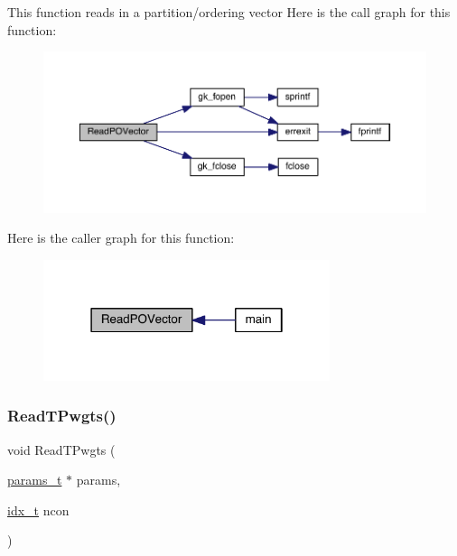 This function reads in a partition/ordering vector Here is the call graph for this function\+:\nopagebreak
\begin{figure}[H]
\begin{center}
\leavevmode
\includegraphics[width=350pt]{a00948_a65a7c382444e5132dafddb75b6117754_cgraph}
\end{center}
\end{figure}
Here is the caller graph for this function\+:\nopagebreak
\begin{figure}[H]
\begin{center}
\leavevmode
\includegraphics[width=238pt]{a00948_a65a7c382444e5132dafddb75b6117754_icgraph}
\end{center}
\end{figure}
\mbox{\label{a00948_a12b940ccee061b8787088fbe16245f46}} 
\subsubsection{\texorpdfstring{Read\+T\+Pwgts()}{ReadTPwgts()}}
{\footnotesize\ttfamily void Read\+T\+Pwgts (\begin{DoxyParamCaption}\item[{\hyperlink{a00706}{params\+\_\+t} $\ast$}]{params,  }\item[{\hyperlink{a00876_aaa5262be3e700770163401acb0150f52}{idx\+\_\+t}}]{ncon }\end{DoxyParamCaption})}

